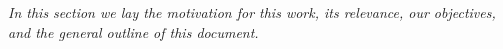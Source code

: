 \label{cap:int}

\textit{In this section we lay the motivation for this work, its relevance, our objectives, and the general outline of this document.}





%


\cleardoublepage